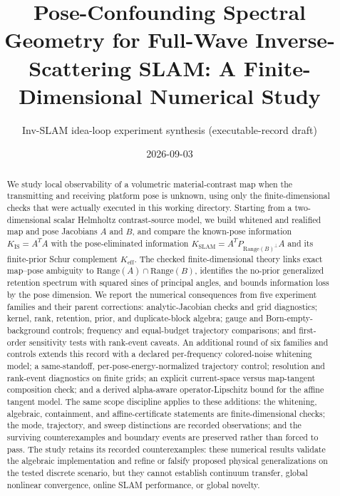 \documentclass[12pt]{article}
\title{Pose-Confounding Spectral Geometry for Full-Wave Inverse-Scattering SLAM:
A Finite-Dimensional Numerical Study}
\author{Inv-SLAM idea-loop experiment synthesis (executable-record draft)}
\date{2026-09-03}
\begin{document}
\maketitle

\begin{abstract}
We study local observability of a volumetric material-contrast map when the
transmitting and receiving platform pose is unknown, using only the
finite-dimensional checks that were actually executed in this working
directory. Starting from a two-dimensional scalar Helmholtz contrast-source
model, we build whitened and realified map and pose Jacobians $A$ and $B$, and
compare the known-pose information $K_{\mathrm{IS}}=A^TA$ with the
pose-eliminated information
$K_{\mathrm{SLAM}}=A^T P_{\mathrm{Range}(B)^\perp}A$ and its finite-prior
Schur complement $K_{\mathrm{eff}}$. The checked finite-dimensional theory
links exact map--pose ambiguity to $\mathrm{Range}(A)\cap\mathrm{Range}(B)$,
identifies the no-prior generalized retention spectrum with squared sines of
principal angles, and bounds information loss by the pose dimension. We report
the numerical consequences from five experiment families and their parent
corrections: analytic-Jacobian checks and grid diagnostics; kernel, rank,
retention, prior, and duplicate-block algebra; gauge and Born-empty-background
controls; frequency and equal-budget trajectory comparisons; and first-order
sensitivity tests with rank-event caveats. An additional round of six
families and controls extends this record with a declared per-frequency
colored-noise whitening model; a same-standoff, per-pose-energy-normalized
trajectory control; resolution and rank-event diagnostics on finite grids; an
explicit current-space versus map-tangent composition check; and a derived
alpha-aware operator-Lipschitz bound for the affine tangent model. The same
scope discipline applies to these additions: the whitening, algebraic,
containment, and affine-certificate statements are finite-dimensional checks;
the mode, trajectory, and sweep distinctions are recorded observations; and
the surviving counterexamples and boundary events are preserved rather than
forced to pass. The study retains its recorded
counterexamples: these numerical results validate the algebraic implementation
and refine or falsify proposed physical generalizations on the tested discrete
scenario, but they cannot establish continuum transfer, global nonlinear
convergence, online SLAM performance, or global novelty.
\end{abstract}

\tableofcontents
\end{document}
